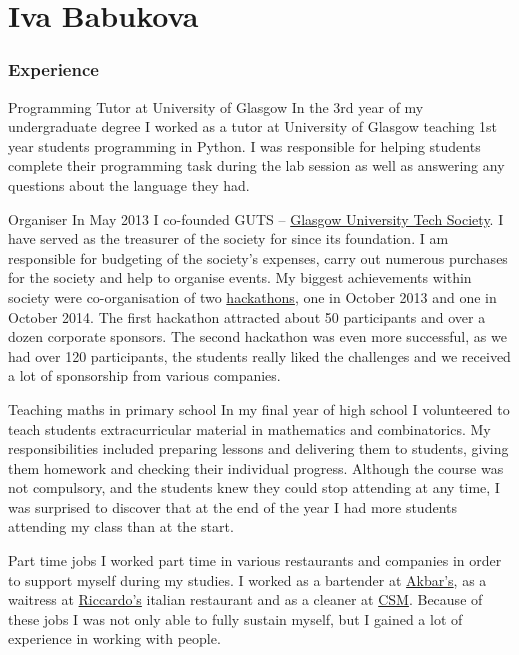 \documentclass{tccv}
\begin{document}
\setlength{\emergencystretch}{3em}
\part{Iva Babukova}

\section{Experience}

\begin{skillist}

\item{Programming Tutor at University of Glasgow} {In the 3rd year of my undergraduate degree I worked as a tutor at University of Glasgow teaching 1st year students programming in Python. I was responsible for helping students complete their programming task during the lab session as well as answering any questions about the language they had.}

\item{Organiser} {In May 2013 I co-founded GUTS -- \href{http://gutechsoc.com}{Glasgow University Tech Society}. I have served as the treasurer of the society for since its foundation. I am responsible for budgeting of the society's expenses, carry out numerous purchases for the society and help to organise events. My biggest achievements within society were co-organisation of two \href{http://storify.com/Eventhread/gu-hackaton}{hackathons}, one in October 2013 and one in October 2014. The first hackathon attracted about 50 participants and over a dozen corporate sponsors. The second hackathon was even more successful, as we had over 120 participants, the students really liked the challenges and we received a lot of sponsorship from various companies.}


\item{Teaching maths in primary school} {In my final year of high school I volunteered to teach students extracurricular material in mathematics and combinatorics. My responsibilities included preparing lessons and delivering them to students, giving them homework and checking their individual progress. Although the course was not compulsory, and the students knew they could stop attending at any time, I was surprised to discover that at the end of the year I had more students attending my class than at the start.}


\item{Part time jobs} {I worked part time in various restaurants and companies in order to support myself during my studies. I worked as a bartender at \href{http://www.akbars.co.uk/glasgow}{Akbar's}, as a waitress at \href{http://www.tripadvisor.co.uk/Restaurant_Review-g186534-d4087172-Reviews-Riccardo_s_Italian_Kitchen-Glasgow_Scotland.html}{Riccardo's} italian restaurant and as a cleaner at \href{http://www.csmfacilities.co.uk/cleaning-company-glasgow/}{CSM}. Because of these jobs I was not only able to fully sustain myself, but I gained a lot of experience in working with people.}

\end{skillist}
\end{document}
